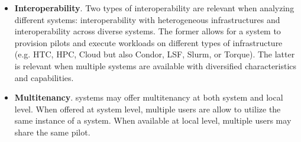 \documentclass{sig-alternate}
\begin{document}
\begin{itemize}
\item \textbf{Interoperability}. Two types of interoperability are
  relevant when analyzing different \pilot systems: interoperability with
  heterogeneous infrastructures and interoperability across diverse
  \pilot systems. The former allows for a \pilot system to provision pilots
  and execute workloads on different types of infrastructure (e.g. HTC, HPC,
  Cloud but also Condor, LSF, Slurm, or Torque). The latter is relevant when
  multiple \pilot systems are available with diversified characteristics and
  capabilities.



\item \textbf{Multitenancy}. \pilot systems may offer multitenancy at both
  system and local level. When offered at system level, multiple users are
  allow to utilize the same instance of a \pilot system. When available at
  local level, multiple users may share the same pilot.
   




\end{itemize}
\end{document}
